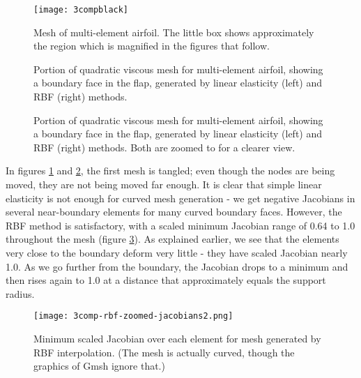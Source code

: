  \begin{figure}
 	\centering
 	\texttt{[image: 3compblack]}
 	\caption{Mesh of multi-element airfoil. The little box shows approximately the region which is magnified in the figures that follow.}
 \end{figure}
 
 \begin{figure}
 	\centering
 	\caption{Portion of quadratic viscous mesh for multi-element airfoil, showing a boundary face in the flap, generated by linear elasticity (left) and RBF (right) methods.}
 	\label{fig:tangled1}
 \end{figure}
 
 \begin{figure}[!h]
 	\centering
 	\caption{Portion of quadratic viscous mesh for multi-element airfoil, showing a boundary face in the flap, generated by linear elasticity (left) and RBF (right) methods. Both are zoomed to for a clearer view.}
 	\label{fig:tangled2}
 \end{figure}
 
 In figures \ref{fig:tangled1} and \ref{fig:tangled2}, the first mesh is tangled; even though the nodes are being moved, they are not being moved far enough. It is clear that simple linear elasticity is not enough for curved mesh generation - we get negative Jacobians in several near-boundary elements for many curved boundary faces. However, the RBF method is satisfactory, with a scaled minimum Jacobian range of 0.64 to 1.0 throughout the mesh (figure \ref{fig:rbf-jacobians}). As explained earlier, we see that the elements very close to the boundary deform very little - they have scaled Jacobian nearly 1.0. As we go further from the boundary, the Jacobian drops to a minimum and then rises again to 1.0 at a distance that approximately equals the support radius.
 
 \begin{figure}
 	\centering
 	\texttt{[image: 3comp-rbf-zoomed-jacobians2.png]}
 	\caption{Minimum scaled Jacobian over each element for mesh generated by RBF interpolation. (The mesh is actually curved, though the graphics of Gmsh ignore that.)}
 	\label{fig:rbf-jacobians}
 \end{figure}
